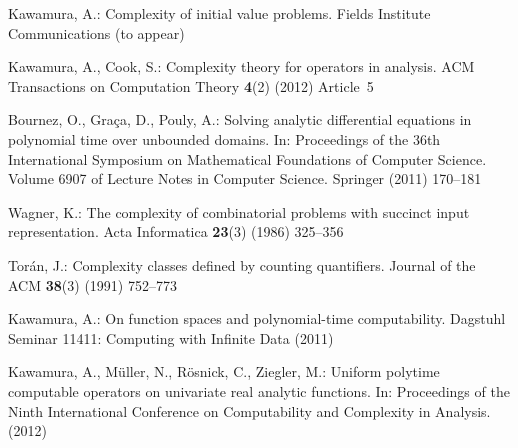\documentclass[envcountsame]{llncs}
\begin{document}
\begin{thebibliography}{10}
Kawamura, A.:
\newblock Complexity of initial value problems. 
\newblock Fields Institute Communications (to appear)

Kawamura, A., Cook, S.:
\newblock Complexity theory for operators in analysis.
\newblock ACM Transactions on Computation Theory \textbf{4}(2) (2012) Article~5

Bournez, O., Gra{\c c}a, D., Pouly, A.:
\newblock Solving analytic differential equations in polynomial time over
  unbounded domains.
\newblock In: Proceedings of the 
  36th International Symposium on Mathematical Foundations of Computer Science. 
\newblock Volume 6907 of Lecture Notes in Computer Science. 
  Springer (2011)  170--181

Wagner, K.:
\newblock The complexity of combinatorial problems with succinct input
  representation.
\newblock Acta Informatica \textbf{23}(3) (1986)  325--356

Tor{\'a}n, J.:
\newblock Complexity classes defined by counting quantifiers.
\newblock Journal of the ACM \textbf{38}(3) (1991)  752--773

Kawamura, A.:
\newblock On function spaces and polynomial-time computability.
\newblock Dagstuhl Seminar 11411: Computing with Infinite Data (2011)

Kawamura, A., M{\"u}ller, N., R{\"o}snick, C., Ziegler, M.:
\newblock Uniform polytime computable operators on univariate real analytic
  functions.
\newblock In: Proceedings of the Ninth International Conference on
  Computability and Complexity in Analysis. (2012)

\end{thebibliography}
\end{document}

